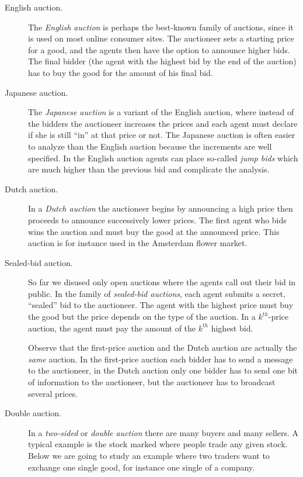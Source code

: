 \begin{description}
\item[English auction.] 
The \emph{English auction} is perhaps the best-known family of auctions, since it is used on most online consumer sites. The auctioneer sets a starting price for a good, and the agents then have the option to announce higher bids. The final bidder (the agent with the highest bid by the end of the auction) has to buy the good for the amount of his final bid.
      
\item[Japanese auction.]
The \emph{Japanese auction} is a variant of the English auction, where instead of the bidders the auctioneer increases the prices and each agent must declare if she is still ``in'' at that price or not. The Japanese auction is often easier to analyze than the English auction because the increments are well specified. In the English auction agents can place so-called \emph{jump bids} which are much higher than the previous bid and complicate the analysis.

\item[Dutch auction.]
In a \emph{Dutch auction} the auctioneer begins by announcing a high price then proceeds to announce successively lower prices. The first agent who bids wins the auction and must buy the good at the announced price. This auction is for instance used in the Amsterdam flower market.

\item[Sealed-bid auction.]
So far we disused only open auctions where the agents call out their bid in public. In the family of \emph{sealed-bid auctions}, each agent submits a secret, ``sealed'' bid to the auctioneer. The agent with the highest price must buy the good but the price depends on the type of the auction. In a $k^{th}$-price auction, the agent must  pay the amount of the  $k^{th}$ highest bid.

Observe that the first-price auction and the Dutch auction are actually the \emph{same} auction. In the first-price auction each bidder has to send a message to the auctioneer, in the Dutch auction only one bidder has to send one bit of information to the auctioneer, but the auctioneer has to broadcast several prices. 

\item[Double auction.]
In a \emph{two-sided} or \emph{double auction} there are many buyers and many sellers. A typical example is the stock marked where people trade any given stock. Below we are going to study an example where two traders want to exchange one single good, for instance one single of a company.

\end{description}

